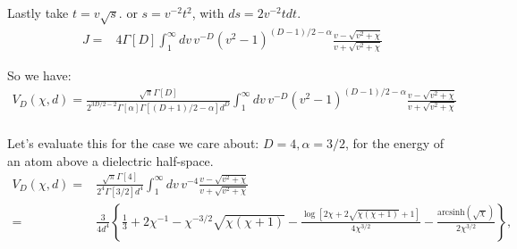 Lastly take $t= v\sqrt{s}$.  or $s = v^{-2}t^2$, with $ds = 2v^{-2}t dt$.  
\begin{align}
J %
=& 4\Gamma[D]\int_{1}^\infty dv\,v^{-D}(v^2-1)^{(D-1)/2-\alpha}\frac{v-\sqrt{v^2+\chi}}{v+\sqrt{v^2+\chi  }}
\end{align}

So we have:
\begin{align}
V_D(\chi,d)=\frac{\sqrt{\pi}\Gamma[D]}{2^{3D/2-2}\Gamma[\alpha]\Gamma\left[(D+1)/2-\alpha\right]d^D}\int_{1}^\infty dv\,v^{-D}(v^2-1)^{(D-1)/2-\alpha}\frac{v-\sqrt{v^2+\chi}}{v+\sqrt{v^2+\chi  }}\nonumber \\
\end{align}

Let's evaluate this for the case we care about: $D=4,\alpha=3/2$, for the energy of an atom above a dielectric half-space.
\begin{align}
V_D(\chi,d)=&\frac{\sqrt{\pi}\Gamma[4]}{2^{4}\Gamma[3/2]d^4}\int_{1}^\infty dv\,v^{-4}\frac{v-\sqrt{v^2+\chi}}{v+\sqrt{v^2+\chi  }}\nonumber \\
=&\frac{3}{4d^4}\left\{ \frac{1}{3}+2\chi^{-1}- \chi^{-3/2}\sqrt{\chi  (\chi +1)} -\frac{\log \left[2 \chi +2 \sqrt{\chi  (\chi+1)}+1\right]}{4 \chi^{3/2}}-\frac{\text{arcsinh}\left(\sqrt{\chi }\right)}{2\chi^{3/2}}\right\},
\end{align}


